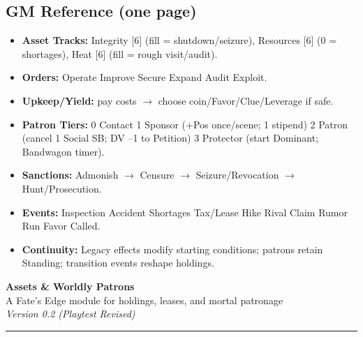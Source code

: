 \documentclass[10pt]{article}
\begin{document}
\begin{center}
    \section*{GM Reference (one page)}
    \begin{itemize}
      \item \textbf{Asset Tracks:} Integrity [6] (fill = shutdown/seizure), Resources [6] (0 = shortages), Heat [6] (fill = rough visit/audit).
      \item \textbf{Orders:} Operate \textbullet{} Improve \textbullet{} Secure \textbullet{} Expand \textbullet{} Audit \textbullet{} Exploit.
      \item \textbf{Upkeep/Yield:} pay costs $\to$ choose coin/Favor/Clue/Leverage if safe.
      \item \textbf{Patron Tiers:} 0 Contact \textbullet{} 1 Sponsor (+Pos once/scene; 1 stipend) \textbullet{} 2 Patron (cancel 1 Social SB; DV --1 to Petition) \textbullet{} 3 Protector (start Dominant; Bandwagon timer).
      \item \textbf{Sanctions:} Admonish $\to$ Censure $\to$ Seizure/Revocation $\to$ Hunt/Prosecution.
      \item \textbf{Events:} Inspection \textbullet{} Accident \textbullet{} Shortages \textbullet{} Tax/Lease Hike \textbullet{} Rival Claim \textbullet{} Rumor Run \textbullet{} Favor Called.
      \item \textbf{Continuity:} Legacy effects modify starting conditions; patrons retain Standing; transition events reshape holdings.
    \end{itemize}
    
    \begin{center}
        {\LARGE \textbf{Assets \& Worldly Patrons}}\\[3pt]
        {\large A Fate's Edge module for holdings, leases, and mortal patronage}\\[2pt]
        \textit{Version 0.2 (Playtest Revised)}
        \end{center}
        \vspace{0.25em}
        \hrule\vspace{0.75em}
    \end{center}
\end{document}
